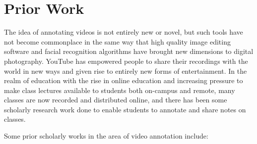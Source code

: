 %
\chapter{Prior Work}
\label{sec:priorwork}



The idea of annotating videos is not entirely new or novel, but such tools have not become commonplace in the same way that high quality image editing software and facial recognition algorithms have brought new dimensions to digital photography.  YouTube has empowered people to share their recordings with the world in new ways and given rise to entirely new forms of entertainment.  In the realm of education with the rise in online education and increasing pressure to make class lectures available to students both on-campus and remote, many classes are now recorded and distributed online, and there has been some scholarly research work done to enable students to annotate and share notes on classes.

Some prior scholarly works in the area of video annotation include:


